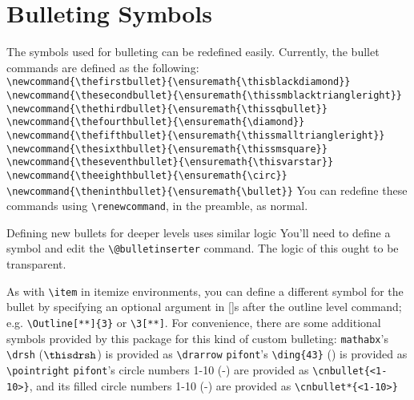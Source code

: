 \documentclass[11pt]{article}
\begin{document}
\newpage
\section{Bulleting Symbols}\label{sec: bullets}
\1 The symbols used for bulleting can be redefined easily.
	\2 Currently, the bullet commands are defined as the following:\\
		\verb+\newcommand{\thefirstbullet}{\ensuremath{\thisblackdiamond}}+\\
		\verb+\newcommand{\thesecondbullet}{\ensuremath{\thissmblacktriangleright}}+\\
		\verb+\newcommand{\thethirdbullet}{\ensuremath{\thissqbullet}}+\\
		\verb+\newcommand{\thefourthbullet}{\ensuremath{\diamond}}+\\
		\verb+\newcommand{\thefifthbullet}{\ensuremath{\thissmalltriangleright}}+\\
		\verb+\newcommand{\thesixthbullet}{\ensuremath{\thissmsquare}}+\\
		\verb+\newcommand{\theseventhbullet}{\ensuremath{\thisvarstar}}+\\
		\verb+\newcommand{\theeighthbullet}{\ensuremath{\circ}}+\\
		\verb+\newcommand{\theninthbullet}{\ensuremath{\bullet}}+
	\2 You can redefine these commands using \verb+\renewcommand+, in the preamble, as normal.

\1 Defining new bullets for deeper levels uses similar logic
	\2 You'll need to define a symbol and edit the \verb+\@bulletinserter+ command.
	\2 The logic of this ought to be transparent.

\1 As with \verb+\item+ in itemize environments, you can define a different symbol for the bullet by specifying an optional argument in []s after the outline level command; e.g. \verb+\Outline[**]{3}+ or \verb+\3[**]+.
	\2 For convenience, there are some additional symbols provided by this package for this kind of custom bulleting:
		\3[\drarrow] \verb+mathabx+'s \verb+\drsh+ (\ensuremath{\thisdrsh}) is provided as \verb+\drarrow+
		\3[\pointright] \verb+pifont+'s \verb+\ding{43}+ (\pointright) is provided as \verb+\pointright+
		\3[\cnbullet{3}] \verb+pifont+'s circle numbers 1-10 (-) are provided as \verb+\cnbullet{<1-10>}+, and its filled circle numbers 1-10 (-) are provided as \verb+\cnbullet*{<1-10>}+
\end{document}
